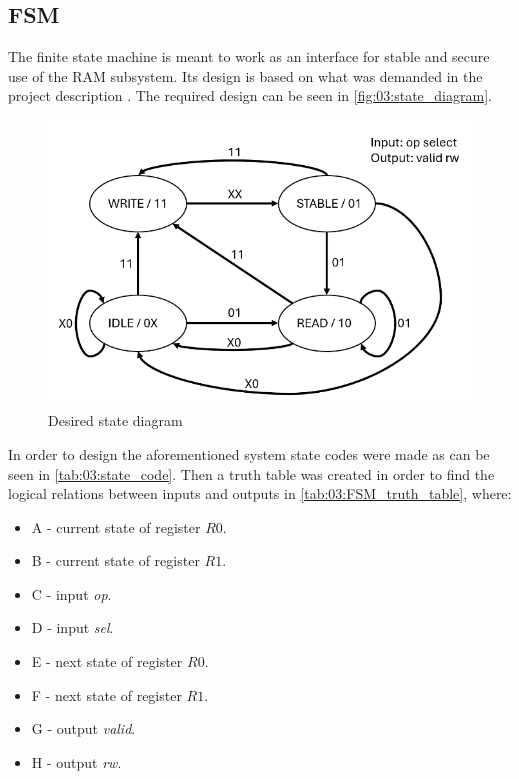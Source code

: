 \subsection{FSM}
The finite state machine is meant to work as an interface for stable and secure use of the RAM subsystem. Its design is based on what was demanded in the project description \cite{oppgavebeskrivelse}. The required design can be seen in \autoref{fig:03:state_diagram}. 

\begin{figure}[H]
    \centering
    \includegraphics[width=0.6\linewidth]{LaTeX_2/Figures/state_diagram.png}
    \caption{Desired state diagram \cite{oppgavebeskrivelse}}
    \label{fig:03:state_diagram}
\end{figure}

In order to design the aforementioned system state codes were made as can be seen in \autoref{tab:03:state_code}. Then a truth table was created in order to find the logical relations between inputs and outputs in \autoref{tab:03:FSM_truth_table}, where:
\begin{itemize}
    \item A - current state of register $R0$.
    \item B - current state of register $R1$.
    \item C - input \textit{op}.
    \item D - input \textit{sel}.
    \item E - next state of register $R0$.
    \item F - next state of register $R1$.
    \item G - output \textit{valid}.
    \item H - output \textit{rw}.
\end{itemize}


